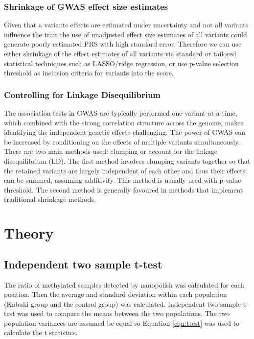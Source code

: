 \subsubsection{Shrinkage of GWAS effect size estimates}
Given that a variants effects are estimated under uncertainty and not all variants influence the trait the use of unadjusted effect size estimates of all variants could generate poorly estimated PRS with high standard error. Therefore we can use either shrinkage of the effect estimates of all variants via standard or tailored statistical techniques such as LASSO/ridge regression, or use p-value selection threshold as inclusion criteria for variants into the score.

\subsubsection{Controlling for Linkage Disequilibrium}
The association tests in GWAS are typically performed one-variant-at-a-time, which combined with the strong correlation structure across the genome, makes identifying the independent genetic effects challenging. The power of GWAS can be increased by conditioning on the effects of multiple variants simultaneously. There are two main methods used: clumping or account for the linkage disequilibrium (LD). The first method involves clumping variants together so that the retained variants are largely independent of each other and thus their effects can be summed, assuming additivity. This method is usually used with p-value threshold. The second method is generally favoured in methods that implement traditional shrinkage methods.



\section{Theory}
\subsection{Independent two sample t-test}
The ratio of methylated samples detected by nanopolish was calculated for each position. Then the average and standard deviation within each population (Kabuki group and the control group) was calculated. Independent two-sample t-test was used to compare the means between the two populations. The two population variances are assumed be equal so Equation \ref{eqn:ttest} was used to calculate the t statistics. %

